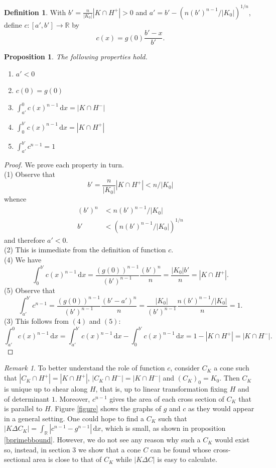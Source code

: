 \documentclass[12pt,reqno]{amsart}
\newcommand{\R}{\mathbb{R}}
\theoremstyle{plain}
\newtheorem{prop}[teor]{Proposition}
\theoremstyle{definition}
\newtheorem{defi}[teor]{Definition}
\theoremstyle{remark}
\newtheorem{nota}[teor]{Remark}
\numberwithin{equation}{section}
\newcommand{\dx}[0]{\,\mathrm{d}x}
\begin{document}
\begin{defi}
    With $b'=\frac{n}{|K_0|}|K\cap H^+|>0$ and $a'=b'-\left(n(b')^{n-1}/|K_0|\right)^{1/n}$, define $c:[a',b']\to\R$ by
        $$c(x)=g(0)\frac{b'-x}{b'}.$$
\end{defi}

\begin{prop}\label{propdefi2}
    The following properties hold.
    \begin{enumerate}
    \item $a'< 0$
        \item $c(0)=g(0)$
        \item $\int_{a'}^0c(x)^{n-1}\dx=|K\cap H^-|$
        \item $\int_0^{b'}c(x)^{n-1}\dx=|K\cap H^+|$
        \item $\int_{a'}^{b'} c^{n-1}=1$
    \end{enumerate}
\end{prop}
\begin{proof}
     We prove each property in turn.\\
     (1) Observe that $$b'=\frac{n}{|K_0|}|K\cap H^+|<n/|K_0|$$ whence
     \begin{align*}
     (b')^n&< n(b')^{n-1}/|K_0|\\
     b'&<(n(b')^{n-1}/|K_0|)^{1/n}
     \end{align*} and therefore $a'< 0$.\\
     (2) This is immediate from the definition of function $c$.\\
     (4) We have $$\int_0^{b'}c(x)^{n-1}\dx=\frac{(g(0))^{n-1}}{(b')^{n-1}}\frac{(b')^n}{n}=\frac{|K_0|b'}{n}=|K\cap H^+|.$$
     (5) Observe that $$\int_{a'}^{b'} c^{n-1}=\frac{(g(0))^{n-1}}{(b')^{n-1}}\frac{(b'-a')^{n}}{n}=\frac{|K_0|}{(b')^{n-1}}\frac{n(b')^{n-1}/|K_0|}{n}=1.$$
     (3) This follows from $(4)$ and $(5)$:
     $$\int_{a'}^0c(x)^{n-1}\dx=\int_{a'}^{b'}c(x)^{n-1}\dx-\int_0^{b'}c(x)^{n-1}\dx= 1-|K\cap H^+|=|K\cap H^-|.$$
\end{proof}

\begin{nota}
    To better understand the role of function $c$, consider $C_K$ a cone such that $|C_K\cap H^+|=|K\cap H^+|$, $|C_K\cap H^-|=|K\cap H^-|$ and $(C_K)_0=K_0$. Then $C_K$ is unique up to shear along $H$, that is, up to linear transformation fixing $H$ and of determinant $1$. Moreover, $c^{n-1}$ gives the area of each cross section of $C_K$ that is parallel to $H$. Figure \ref{figure} shows the graphs of $g$ and $c$ as they would appear in a general setting. One could hope to find a $C_K$ such that $|K\Delta C_K|=\int_{\mathbb{R}} |c^{n-1}-g^{n-1}|\dx$, which is small, as shown in proposition \ref{bprimebbound}. However, we do not see any reason why such a $C_K$ would exist so, instead, in section 3 we show that a cone $C$ can be found whose cross-sectional area is close to that of $C_K$ while $|K\Delta C|$ is easy to calculate.
\end{nota}
\end{document}
